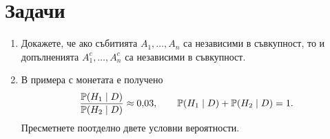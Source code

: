 \section{Задачи}

\begin{enumerate}
    \item Докажете, че ако събитията $A_1,\dots,A_n$ са независими в съвкупност, то и допълненията $A_1^c,\dots,A_n^c$ са независими в съвкупност.
    \item В примера с монетата е получено
    \[
    \frac{\mathbb{P}(H_1 \mid D)}{\mathbb{P}(H_2 \mid D)} \approx 0{,}03,
    \qquad
    \mathbb{P}(H_1 \mid D)+\mathbb{P}(H_2 \mid D)=1.
    \]
    Пресметнете поотделно двете условни вероятности.
\end{enumerate}
